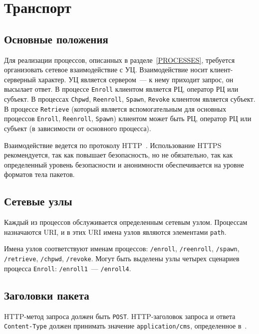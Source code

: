 \chapter{Транспорт}\label{TRANSPORT}

\section{Основные положения}\label{TRANSPORT.Common}

Для реализации процессов, описанных в разделе~\ref{PROCESSES}, требуется
организовать сетевое взаимодействие с УЦ. Взаимодействие носит
клиент-серверный характер. УЦ является сервером~--- к нему приходит запрос,
он высылает ответ. В процессе  \texttt{Enroll} клиентом является РЦ,
оператор РЦ или субъект. В процессах \texttt{Chpwd}, \texttt{Reenroll},
\texttt{Spawn}, \texttt{Revoke} клиентом является субъект. В процессе
\texttt{Retrieve} (который является вспомогательным для основных процессов
\texttt{Enroll}, \texttt{Reenroll}, \texttt{Spawn}) клиентом может быть РЦ,
оператор РЦ или субъект (в зависимости от основного процесса).

Взаимодействие ведется по протоколу HTTP~\cite{HTTP}.
Использование HTTPS рекомендуется, так как повышает безопасность,
но не обязательно, так как определенный уровень безопасности и анонимности
обеспечивается на уровне форматов тела пакетов.

\section{Сетевые узлы}\label{TRANSPORT.Endpoints}

Каждый из процессов обслуживается определенным сетевым узлом.
Процессам назначаются URI, и в этих URI имена узлов являются
элементами \texttt{path}.

Имена узлов соответствуют именам процессов: 
\texttt{/enroll},
\texttt{/reenroll},
\texttt{/spawn},
\texttt{/retrieve},
\texttt{/chpwd},
\texttt{/revoke}.
%
Могут быть выделены узлы четырех сценариев процесса \texttt{Enroll}:
\texttt{/enroll1}~--- \texttt{/enroll4}.

\section{Заголовки пакета}\label{TRANSPORT.Headers}

HTTP-метод запроса должен быть \texttt{POST}.
HTTP-заголовок запроса и ответа \texttt{Content-Type} должен принимать
значение \texttt{application/cms}, определенное в~\cite{ContentTypeCms}. 

